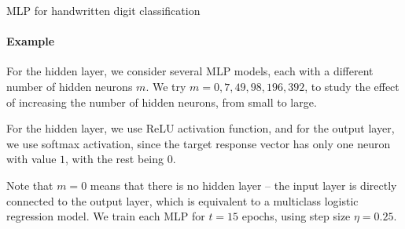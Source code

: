 \begin{frame}{MLP for handwritten digit classification}
\framesubtitle{Example}
    For the hidden layer, we consider several MLP models, each
    with a different number of hidden neurons $m$. We try 
    $m=0, 7, 49, 98, 196, 392$, to study the effect of increasing the
    number of hidden neurons, from small to large. 

	\medskip

	For the hidden layer,
    we use ReLU activation function, and for the output layer, we use
    softmax activation, since the target response vector 
    has only one neuron with value $1$, with the rest being $0$.

\medskip

    Note that $m=0$ means that there is no hidden layer -- the input
    layer is directly connected to the output layer, which is equivalent
    to a multiclass logistic regression model.
    We train each MLP for $t=15$ epochs, using step size $\eta=0.25$.

%
%
%

\end{frame}

